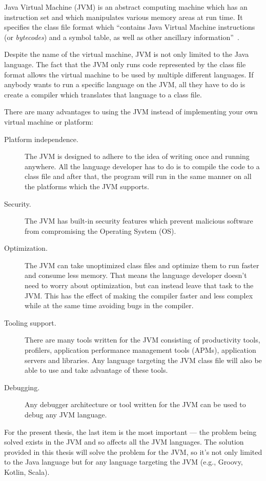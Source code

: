 \documentclass[..thesis.tex]{subfiles}
\begin{document}
Java Virtual Machine (JVM) is an abstract computing machine which has an instruction set and which manipulates various memory areas at run time. %
It specifies the class file format which \enquote{contains Java Virtual Machine instructions (or \textit{bytecodes}) and a symbol table, as well as other ancillary information}~\cite{oracle_jvm_spec}.

Despite the name of the virtual machine, JVM is not only limited to the Java language. 
The fact that the JVM only runs code represented by the class file format allows the virtual machine to be used by multiple different languages.
If anybody wants to run a specific language on the JVM, all they have to do is create a compiler which translates that language to a class file.

There are many advantages to using the JVM instead of implementing your own virtual machine or platform:

\begin{description}
  \item[Platform independence.]
    The JVM is designed to adhere to the idea of writing once and running anywhere. 
    All the language developer has to do is to compile the code to a class file and after that, the program will run in the same manner on all the platforms which the JVM supports.
  \item[Security.] 
    The JVM has built-in security features which prevent malicious software from compromising the Operating System (OS). 
  \item[Optimization.] 
    The JVM can take unoptimized class files and optimize them to run faster and consume less memory. 
    That means the language developer doesn't need to worry about optimization, but can instead leave that task to the JVM.
    This has the effect of making the compiler faster and less complex while at the same time avoiding bugs in the compiler.
  \item[Tooling support.]
    There are many tools written for the JVM consisting of productivity tools, profilers, application performance management tools (APMs), application servers and libraries. 
    Any language targeting the JVM class file will also be able to use and take advantage of these tools.
  \item[Debugging.]
    Any debugger architecture or tool written for the JVM can be used to debug any JVM language.
\end{description}

For the present thesis, the last item is the most important --- the problem being solved exists in the JVM and so affects all the JVM languages. 
The solution provided in this thesis will solve the problem for the JVM, so it's not only limited to the Java language but for any language targeting the JVM (e.g., Groovy, Kotlin, Scala).
\end{document}
